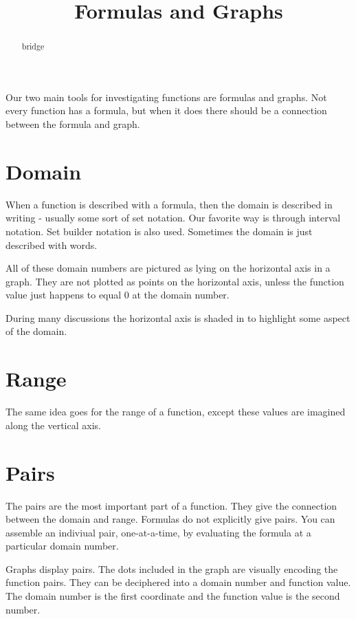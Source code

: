 \documentclass{ximera}
\title{Formulas and Graphs}
\begin{document}
\begin{abstract}
bridge
\end{abstract}
\maketitle



Our two main tools for investigating functions are formulas and graphs. Not every function has a formula, but when it does there should be a connection between the formula and graph.

\section{Domain}
When a function is described with a formula, then the domain is described in writing - usually some sort of set notation.  Our favorite way is through interval notation.  Set builder notation is also used.  Sometimes the domain is just described with words.

All of these domain numbers are pictured as lying on the horizontal axis in a graph.  They are not plotted as points on the horizontal axis, unless the function value just happens to equal $0$ at the domain number.

During many discussions the horizontal axis is shaded in to highlight some aspect of the domain.







\section{Range}
The same idea goes for the range of a function, except these values are imagined along the vertical axis.








\section{Pairs}
The pairs are the most important part of a function.  They give the connection between the domain and range.  Formulas do not explicitly give pairs. You can assemble an indiviual pair, one-at-a-time, by evaluating the formula at a particular domain number.

Graphs display pairs.  The dots included in the graph are visually encoding the function pairs.  They can be deciphered into a domain number and function value. The domain number is the first coordinate and the function value is the second number.
\end{document}
